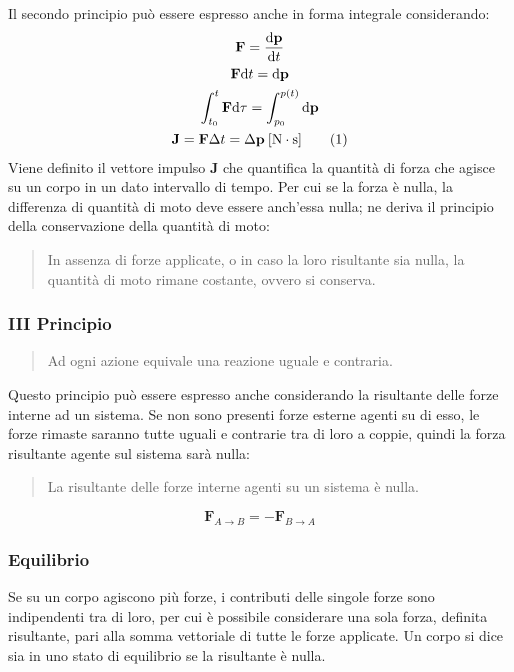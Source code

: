 \documentclass{article}
\newcommand{\vect}[1]{\boldsymbol{\mathbf{#1}}}
\newcommand{\df}{\mathrm{d}}
\numberwithin{equation}{subsection}
\begin{document}
Il secondo principio può essere espresso anche in forma integrale 
considerando: 
\begin{gather*}
    \vect{F}=\displaystyle\frac{\df\vect{p}}{\df t}\\
    \vect{F}\df t=\df\vect{p}\\
    \displaystyle\int_{t_0}^{t}\vect{F}\df\tau=\int_{p_0}^{p(t)}\df\vect{p}\\
    \vect{J}=\vect{F}\Delta t=\Delta\vect{p}\:[\mathrm{N}\cdot \mathrm{s}]\tag{\stepcounter{equation}\theequation}
\end{gather*}
Viene definito il vettore impulso $\vect{J}$ che quantifica la quantità 
di forza che agisce su un corpo in un dato intervallo di tempo. 
Per cui se la forza è nulla, la differenza di quantità di moto deve essere anch'essa nulla; ne deriva il 
principio della conservazione della quantità di moto:
\begin{quotation}
    In assenza di forze applicate, o in caso la loro risultante sia nulla, la quantità di moto rimane costante, ovvero si conserva. 
\end{quotation}

\subsubsection{III Principio}

\begin{quotation}
    Ad ogni azione equivale una reazione uguale e contraria.
\end{quotation}

Questo principio può essere espresso anche considerando la risultante 
delle forze interne ad un sistema. Se non sono presenti 
forze esterne agenti su di esso, le forze rimaste saranno 
tutte uguali e contrarie tra di loro a coppie, quindi la 
forza risultante agente sul sistema sarà nulla:

\begin{quotation}
    La risultante delle forze interne agenti su un sistema è nulla.
\end{quotation}

\begin{equation}
    \vect{F}_{A\to B}=-\vect{F}_{B\to A}
\end{equation}

\subsubsection{Equilibrio}
Se su un corpo agiscono più forze, i contributi delle singole forze sono indipendenti tra di loro, per cui è possibile considerare una sola forza, definita risultante, pari 
alla somma vettoriale di tutte le forze applicate. Un corpo si dice sia in uno stato di equilibrio se la 
risultante è nulla. 
\end{document}
